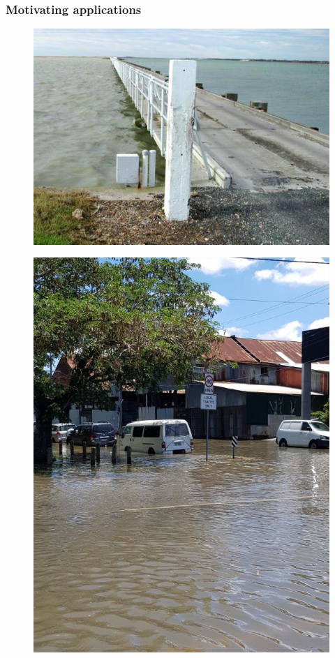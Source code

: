 \begin{frame}
\frametitle{Motivating applications}
\begin{minipage}{0.45\textwidth}
    \begin{figure}      
    \includegraphics[width=\textwidth]{figures/images/goolwa_ewe_island-environment_sa_gov_au.jpg}
    \end{figure}
\end{minipage}
\hfill
\begin{minipage}{0.45\textwidth}
    \begin{figure}      
     \includegraphics[width=\textwidth]{figures/images/sunnyFlood_ClarkJan2018Brisbane.png}
    \end{figure} 
\end{minipage}

\end{frame}
